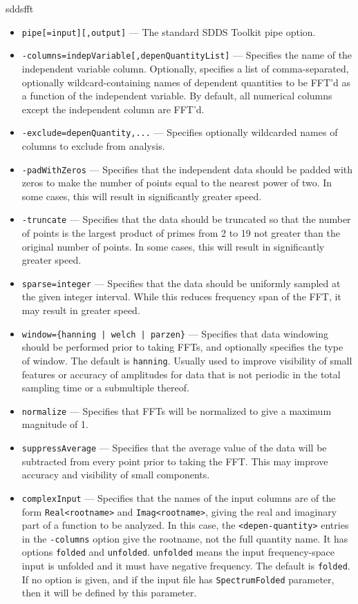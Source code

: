 \begin{sddsprog}{sddsfft}
\begin{itemize}
      \item \verb|pipe[=input][,output]| --- The standard SDDS Toolkit pipe option.
      \item \verb|-columns=indepVariable[,depenQuantityList]| --- Specifies the name of the independent variable column. Optionally, specifies a list of comma-separated, optionally wildcard-containing names of dependent quantities to be FFT'd as a function of the independent variable. By default, all numerical columns except the independent column are FFT'd.
      \item \verb|-exclude=depenQuantity,...| --- Specifies optionally wildcarded names of columns to exclude from analysis.
      \item \verb|-padWithZeros| --- Specifies that the independent data should be padded with zeros to make the number of points equal to the nearest power of two. In some cases, this will result in significantly greater speed.
      \item \verb|-truncate| --- Specifies that the data should be truncated so that the number of points is the largest product of primes from 2 to 19 not greater than the original number of points. In some cases, this will result in significantly greater speed.
      \item \verb|sparse=integer| --- Specifies that the data should be uniformly sampled at the given integer interval. While this reduces frequency span of the FFT, it may result in greater speed.
      \item \verb!window={hanning | welch | parzen}! --- Specifies that data windowing should be performed prior to taking FFTs, and optionally specifies the type of window. The default is \verb|hanning|. Usually used to improve visibility of small features or accuracy of amplitudes for data that is not periodic in the total sampling time or a submultiple thereof.
      \item \verb|normalize| --- Specifies that FFTs will be normalized to give a maximum magnitude of 1.
      \item \verb|suppressAverage| --- Specifies that the average value of the data will be subtracted from every point prior to taking the FFT. This may improve accuracy and visibility of small components.
      \item \verb|complexInput| --- Specifies that the names of the input columns are of the form \verb|Real<rootname>| and \verb|Imag<rootname>|, giving the real and imaginary part of a function to be analyzed. In this case, the \verb|<depen-quantity>| entries in the \verb|-columns| option give the rootname, not the full quantity name. It has options \verb|folded| and \verb|unfolded|. \verb|unfolded| means the input frequency-space input is unfolded and it must have negative frequency. The default is \verb|folded|. If no option is given, and if the input file has \verb|SpectrumFolded| parameter, then it will be defined by this parameter.

\end{itemize}
\end{sddsprog}
